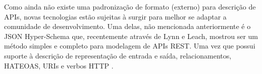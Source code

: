 Como ainda não existe uma padronização de formato (externo) para descrição de APIs, novas tecnologias estão sujeitas à surgir para melhor se adaptar a comunidade de desenvolvimento. Uma delas, não mencionada anteriormente é o JSON Hyper-Schema que, recentemente através de Lynn e Leach, mostrou ser um método simples e completo para modelagem de APIs REST. Uma vez que possui suporte à descrição de representação de entrada e saída, relacionamentos, HATEOAS, URIs e verbos HTTP  \cite{LynnEtAl2016} \cite{Leach2014}.
